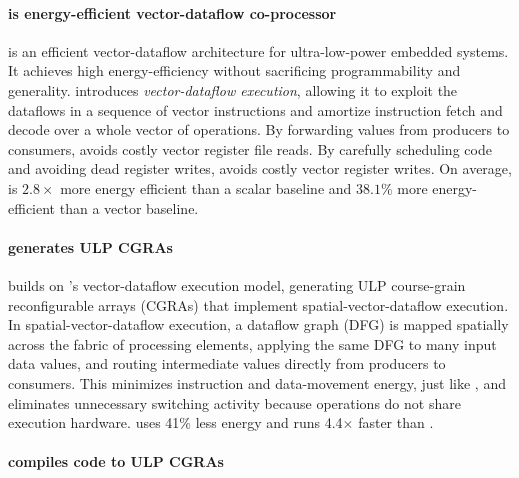 \paragraph{\manic is energy-efficient vector-dataflow co-processor}
\manic is an efficient vector-dataflow architecture for ultra-low-power embedded systems.  
% 
It achieves high energy-efficiency without sacrificing programmability and generality.
% 
\manic introduces \emph{vector-dataflow execution}, allowing it to exploit the
dataflows in a sequence of vector instructions and amortize instruction
fetch and decode over a whole vector of operations.
%
By forwarding values from producers to consumers, \manic avoids costly vector register file reads.
% 
By carefully scheduling code and avoiding dead register writes, \manic avoids costly vector register writes.
% 
On average, \manic is $2.8\times$ more energy efficient than a scalar baseline and $38.1\%$ more energy-efficient than a vector baseline.

\paragraph{\snafu generates ULP CGRAs}
\snafu builds on \manic's vector-dataflow execution model, generating ULP course-grain reconfigurable arrays (CGRAs) that implement spatial-vector-dataflow execution.
% 
In spatial-vector-dataflow execution, a dataflow graph (DFG) is mapped spatially across the fabric of processing elements, applying the same DFG to many input data values, and routing intermediate values directly from producers to consumers.
% 
This minimizes instruction and data-movement energy, just like \manic, and eliminates unnecessary switching activity because operations do not share execution hardware.
% 
\snafu uses 41$\%$ less energy and runs 4.4$\times$ faster than \manic.

\paragraph{\riptide compiles code to ULP CGRAs}
